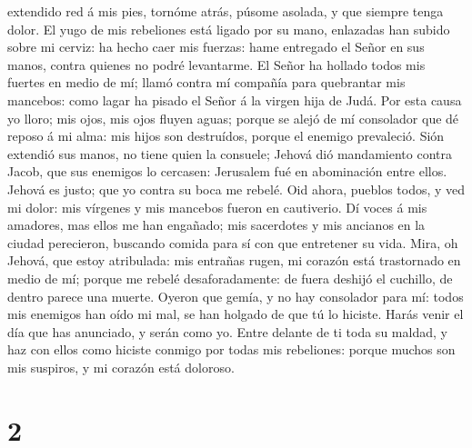 extendido red á mis pies, tornóme atrás, púsome asolada, y que siempre
tenga dolor.  El yugo de mis rebeliones está ligado por su
mano, enlazadas han subido sobre mi cerviz: ha hecho caer mis fuerzas:
hame entregado el Señor en sus manos, contra quienes no podré
levantarme.  El Señor ha hollado todos mis fuertes en medio
de mí; llamó contra mí compañía para quebrantar mis mancebos: como lagar
ha pisado el Señor á la virgen hija de Judá.  Por esta
causa yo lloro; mis ojos, mis ojos fluyen aguas; porque se alejó de mí
consolador que dé reposo á mi alma: mis hijos son destruídos, porque el
enemigo prevaleció.  Sión extendió sus manos, no tiene
quien la consuele; Jehová dió mandamiento contra Jacob, que sus enemigos
lo cercasen: Jerusalem fué en abominación entre ellos. 
Jehová es justo; que yo contra su boca me rebelé. Oid ahora, pueblos
todos, y ved mi dolor: mis vírgenes y mis mancebos fueron en cautiverio.
 Dí voces á mis amadores, mas ellos me han engañado; mis
sacerdotes y mis ancianos en la ciudad perecieron, buscando comida para
sí con que entretener su vida.  Mira, oh Jehová, que estoy
atribulada: mis entrañas rugen, mi corazón está trastornado en medio de
mí; porque me rebelé desaforadamente: de fuera deshijó el cuchillo, de
dentro parece una muerte.  Oyeron que gemía, y no hay
consolador para mí: todos mis enemigos han oído mi mal, se han holgado
de que tú lo hiciste. Harás venir el día que has anunciado, y serán como
yo.  Entre delante de ti toda su maldad, y haz con ellos
como hiciste conmigo por todas mis rebeliones: porque muchos son mis
suspiros, y mi corazón está doloroso.

\hypertarget{section-1}{%
\section{2}\label{section-1}}

